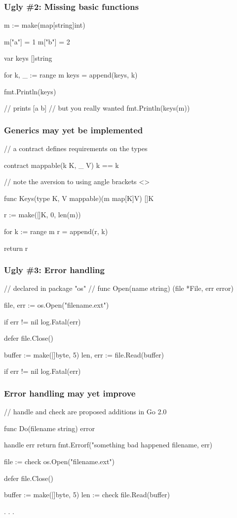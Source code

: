 \documentclass[compress,t,11pt]{beamer}
\begin{document}
\begin{frame}[fragile]
    \frametitle{Ugly \#2: Missing basic functions}
\begin{golang}
m := make(map[string]int)

m["a"] = 1
m["b"] = 2

var keys []string

for k, _ := range m {
    keys = append(keys, k)
}

fmt.Println(keys)

// prints [a b]
// but you really wanted fmt.Println(keys(m))
\end{golang}
\end{frame}

\begin{frame}[fragile]
    \frametitle{Generics may yet be implemented}
\begin{golang}
// a contract defines requirements on the types

contract mappable(k K, _ V) {
    k == k
}

// note the aversion to using angle brackets <>

func Keys(type K, V mappable)(m map[K]V) []K {
	r := make([]K, 0, len(m))

	for k := range m {
		r = append(r, k)
	}

	return r
}
\end{golang}
\end{frame}

\begin{frame}[fragile]
    \frametitle{Ugly \#3: Error handling}
\begin{golang}
// declared in package "os"
// func Open(name string) (file *File, err error)

file, err := os.Open("filename.ext")

if err != nil {
    log.Fatal(err)
}

defer file.Close()

buffer := make([]byte, 5)
len, err := file.Read(buffer)

if err != nil {
    log.Fatal(err)
}
\end{golang}
\end{frame}

\begin{frame}[fragile]
    \frametitle{Error handling may yet improve}
\begin{golang}
// handle and check are proposed additions in Go 2.0

func Do(filename string) error {
    handle err {
    	return fmt.Errorf("something bad happened %
                          filename, err)
    }

    file := check os.Open("filename.ext")

    defer file.Close()

    buffer := make([]byte, 5)
    len := check file.Read(buffer)

    . . .
}
\end{golang}
\end{frame}
\end{document}
